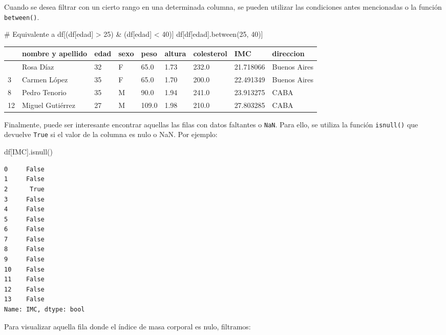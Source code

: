 \documentclass[
  letterpaper,
  DIV=11,
  numbers=noendperiod]{scrreprt}
\newenvironment{Shaded}{\begin{snugshade}}{\end{snugshade}}
\newcommand{\CommentTok}[1]{\textcolor[rgb]{0.37,0.37,0.37}{#1}}
\newcommand{\DecValTok}[1]{\textcolor[rgb]{0.68,0.00,0.00}{#1}}
\newcommand{\NormalTok}[1]{\textcolor[rgb]{0.00,0.23,0.31}{#1}}
\newcommand{\StringTok}[1]{\textcolor[rgb]{0.13,0.47,0.30}{#1}}
\begin{document}
Cuando se desea filtrar con un cierto rango en una determinada columna,
se pueden utilizar las condiciones antes mencionadas o la función
\texttt{between()}.

\begin{Shaded}
\begin{Highlighting}[]
\CommentTok{\# Equivalente a df[(df[\textquotesingle{}edad\textquotesingle{}] \textgreater{} 25) \& (df[\textquotesingle{}edad\textquotesingle{}] \textless{} 40)]}
\NormalTok{df[df[}\StringTok{\textquotesingle{}edad\textquotesingle{}}\NormalTok{].between(}\DecValTok{25}\NormalTok{, }\DecValTok{40}\NormalTok{)]}
\end{Highlighting}
\end{Shaded}

\begin{longtable}[]{@{}lllllllll@{}}
\toprule\noalign{}
& nombre y apellido & edad & sexo & peso & altura & colesterol & IMC &
direccion \\
\midrule\noalign{}
\endhead
\bottomrule\noalign{}
\endlastfoot
1 & Rosa Díaz & 32 & F & 65.0 & 1.73 & 232.0 & 21.718066 & Buenos
Aires \\
3 & Carmen López & 35 & F & 65.0 & 1.70 & 200.0 & 22.491349 & Buenos
Aires \\
8 & Pedro Tenorio & 35 & M & 90.0 & 1.94 & 241.0 & 23.913275 & CABA \\
12 & Miguel Gutiérrez & 27 & M & 109.0 & 1.98 & 210.0 & 27.803285 &
CABA \\
\end{longtable}

Finalmente, puede ser interesante encontrar aquellas las filas con datos
faltantes o \texttt{NaN}. Para ello, se utiliza la función
\texttt{isnull()} que devuelve \texttt{True} si el valor de la columna
es nulo o NaN. Por ejemplo:

\begin{Shaded}
\begin{Highlighting}[]
\NormalTok{df[}\StringTok{\textquotesingle{}IMC\textquotesingle{}}\NormalTok{].isnull()}
\end{Highlighting}
\end{Shaded}

\begin{verbatim}
0     False
1     False
2      True
3     False
4     False
5     False
6     False
7     False
8     False
9     False
10    False
11    False
12    False
13    False
Name: IMC, dtype: bool
\end{verbatim}

Para visualizar aquella fila donde el índice de masa corporal es nulo,
filtramos:
\end{document}
